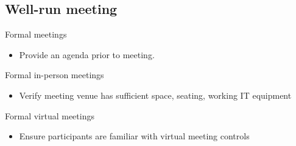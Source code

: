 \subsection{Well-run meeting\label{well-run_meeting}}

Formal meetings
\begin{itemize}
    \item Provide an agenda prior to meeting.
\end{itemize}
Formal in-person meetings
\begin{itemize}
    \item Verify meeting venue has sufficient space, seating, working IT equipment
\end{itemize}
Formal virtual meetings
\begin{itemize}
    \item Ensure participants are familiar with virtual meeting controls
\end{itemize}

